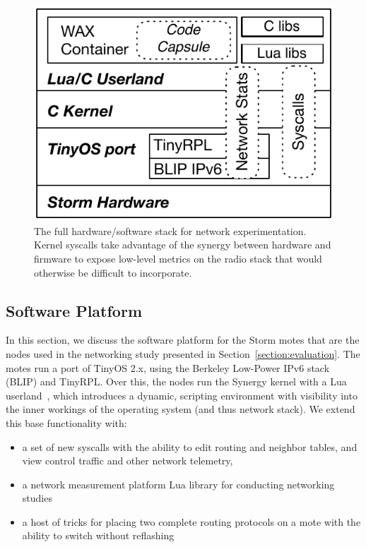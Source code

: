 \begin{figure}[t]
\centering
\includegraphics[width=.9\linewidth]{figs/NodeStack}
\caption{The full hardware/software stack for network experimentation. Kernel syscalls take advantage of the synergy between hardware and firmware to expose low-level metrics on the radio
stack that would otherwise be difficult to incorporate.}
\label{fig:nodestack}
\end{figure}


\subsection{Software Platform}

In this section, we discuss the software platform for the Storm motes that are the nodes used in the networking study presented in Section~\ref{section:evaluation}.
The motes run a port of TinyOS 2.x, using the Berkeley Low-Power IPv6 stack (BLIP) and TinyRPL.
Over this, the nodes run the Synergy kernel with a Lua userland~\cite{andersen2016system}, which introduces a dynamic, scripting environment with visibility into the inner workings of the operating system (and thus network stack).
We extend this base functionality with:
\begin{itemize}
\item a set of new syscalls with the ability to edit routing and neighbor tables, and view control traffic and other network telemetry,
\item a network measurement platform Lua library for conducting networking studies
\item a host of tricks for placing two complete routing protocols on a mote with the ability to switch without reflashing
\end{itemize}

